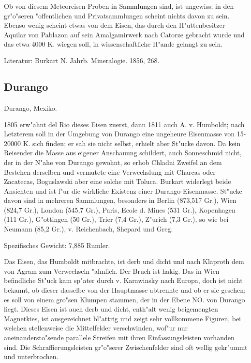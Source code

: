 \documentclass[a4paper, 11pt, oneside]{article}
\begin{document}
Ob von diesem Meteoreisen Proben in Sammlungen sind, ist ungewiss; in den gr"o"seren "offentlichen und Privatsammlungen scheint nichts davon zu sein. Ebenso wenig scheint etwas von dem Eisen, das durch den H"uttenbesitzer Aquilar von Pablazon auf sein Amalgamirwerk nach Catorze gebracht wurde und das etwa 4000 K. wiegen soll, in wissenschaftliche H"ande gelangt zu sein.

\footnotesize
Literatur: Burkart N. Jahrb. Mineralogie. 1856, 268.

\subsection{Durango}
\normalsize
\paragraph{}
Durango, Mexiko.

1805 erw"ahnt del Rio dieses Eisen zuerst, dann 1811 auch A. v. Humboldt; nach Letzterem soll in der Umgebung von Durango eine ungeheure Eisenmasse von 15-20000 K. sich finden; er sah sie nicht selbst, erhielt aber St"ucke davon. Da kein Reisender die Masse aus eigener Anschauung schildert, auch Sonneschmid nicht, der in der N"ahe von Durango gewohnt, so erhob Chladni Zweifel an dem Bestehen derselben und vermutete eine Verwechslung mit Charcas oder Zacatecas, Boguslawski aber eine solche mit Toluca. Burkart widerlegt beide Ansichten und ist f"ur die wirkliche Existenz einer Durango-Eisenmasse. St"ucke davon sind in mehreren Sammlungen, besonders in Berlin (873,517 Gr.), Wien (824,7 Gr.), London (545,7 Gr.), Paris, Ecole d. Mines (531 Gr.), Kopenhagen (111 Gr.), G"ottingen (50 Gr.), Trier (7,4 Gr.), Z"urich (7,3 Gr.), so wie bei Neumann (85,2 Gr.), v. Reichenbach, Shepard und Greg.

Spezifisches Gewicht: 7,885 Rumler.

Das Eisen, das Humboldt mitbrachte, ist derb und dicht und nach Klaproth dem von Agram zum Verwechseln "ahnlich. Der Bruch ist hakig. Das in Wien befindliche St"uck kam sp"ater durch v. Karawinsky nach Europa, doch ist nicht bekannt, ob dieser dasselbe von der Hauptmasse abtrennte und ob er sie gesehen; es soll von einem gro"sen Klumpen stammen, der in der Ebene NO. von Durango liegt. Dieses Eisen ist auch derb und dicht, enth"alt wenig beigemengten Magnetkies, ist ausgezeichnet bl"attrig und zeigt sehr vollkommene Figuren, bei welchen stellenweise die Mittelfelder verschwinden, wof"ur nur aneinandersto"sende parallele Streifen mit ihren Einfassungsleisten vorhanden sind. Die Schraffierungsleisten gr"o"serer Zwischenfelder sind oft wellig gekr"ummt und unterbrochen.
\end{document}
